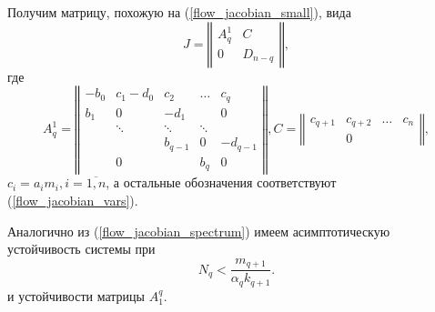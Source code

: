         Получим матрицу, похожую на (\ref{flow_jacobian_small}), вида
        \begin{equation}
            J = \left\Vert \begin{matrix}
                A^1_q & C \\
                0 & D_{n-q}
            \end{matrix} \right\Vert,
        \end{equation}
        где
        \begin{equation}
            A^1_q = \left\Vert \begin{matrix}
                   -b_0  & c_1-d_0&   c_2    &  \dots   & c_q      \\
                    b_1  &  0     &  -d_1    &          &  0       \\
                         & \ddots & \ddots   &  \ddots  &          \\
                         &        & b_{q-1}  &     0    & -d_{q-1} \\
                         &   0    &          & b_{q}    &  0  
            \end{matrix} \right\Vert,
            C = \left\Vert \begin{matrix}
                c_{q+1} & c_{q+2} & \dots & c_{n} \\
                        &    0    &       &
         \end{matrix} \right\Vert,
        \end{equation}
        \( c_i = a_i m_i, i = \overline{1,n} \), а остальные обозначения соответствуют (\ref{flow_jacobian_vars}).

        Аналогично из (\ref{flow_jacobian_spectrum}) имеем асимптотическую устойчивость системы при
        \begin{equation} \label{cycle_nq_upper}
            N_q < \frac{m_{q+1}}{\alpha_q k_{q+1}}.
        \end{equation}
        и устойчивости матрицы \( A^q_1 \).



